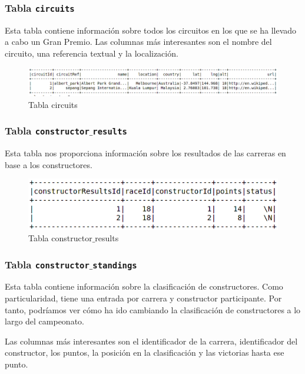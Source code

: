 \documentclass[12pt,twoside,titlepage]{report}
\begin{document}
\subsubsection{Tabla \texttt{circuits}}

Esta tabla contiene información sobre todos los circuitos en los que se ha llevado a cabo un Gran Premio. Las columnas más interesantes son el nombre del circuito, una referencia textual y la localización. 

\begin{figure}[H]
  \includegraphics[scale=0.4]{circuits_table.png}
  \centering
  \caption{Tabla circuits}
  \label{fig:circuits}
  \centering
\end{figure}

\subsubsection{Tabla \texttt{constructor$\_$results}}

Esta tabla nos proporciona información sobre los resultados de las carreras en base a los constructores. 

\begin{figure}[H]
  \includegraphics[scale=0.4]{constructor_results_table.png}
  \centering
  \caption{Tabla constructor$\_$results}
  \label{fig:constructorres}
  \centering
\end{figure}


\subsubsection{Tabla \texttt{constructor$\_$standings}}

Esta tabla contiene información sobre la clasificación de constructores. Como particularidad, tiene una entrada por carrera y constructor participante. Por tanto, podríamos ver cómo ha ido cambiando la clasificación de constructores a lo largo del campeonato.

Las columnas más interesantes son el identificador de la carrera, identificador del constructor, los puntos, la posición en la clasificación y las victorias hasta ese punto. 
\end{document}
